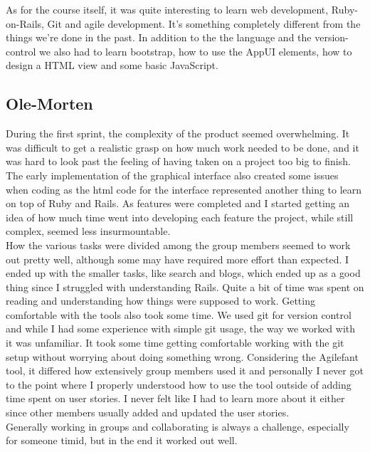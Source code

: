 \documentclass[a4paper]{article}
\begin{document}
\noindent
As for the course itself, it was quite interesting to learn web development, Ruby-on-Rails, Git and agile development. It's something completely different from the things we're done in the past. In addition to the the language and the version-control we also had to learn bootstrap, how to use the AppUI elements, how to design a HTML view and some basic JavaScript. 

\subsection{Ole-Morten}
\noindent
During the first sprint, the complexity of the product seemed overwhelming. It was difficult to get a realistic grasp on how much work needed to be done, and it was hard to look past the feeling of having taken on a project too big to finish. The early implementation of the graphical interface also created some issues when coding as the html code for the interface represented another thing to learn on top of Ruby and Rails. As features were completed and I started getting an idea of how much time went into developing each feature the project, while still complex, seemed less insurmountable.\\

\noindent
How the various tasks were divided among the group members seemed to work out pretty well, although some may have required more effort than expected. I ended up with the smaller tasks, like search and blogs, which ended up as a good thing since I struggled with understanding Rails. Quite a bit of time was spent on reading and understanding how things were supposed to work. Getting comfortable with the tools also took some time. We used git for version control and while I had some experience with simple git usage, the way we worked with it was unfamiliar. It took some time getting comfortable working with the git setup without worrying about doing something wrong. Considering the Agilefant tool, it differed how extensively group members used it and personally I never got to the point where I properly understood how to use the tool outside of adding time spent on user stories. I never felt like I had to learn more about it either since other members usually added and updated the user stories.\\

\noindent
Generally working in groups and collaborating is always a challenge, especially for someone timid, but in the end it worked out well.

\end{document}
